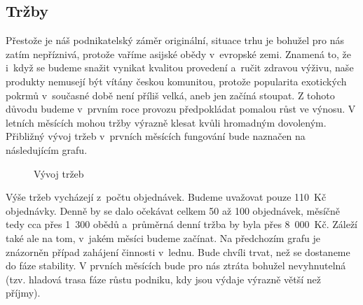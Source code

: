 \subsection{Tržby}
Přestože je náš podnikatelský záměr originální, situace trhu je bohužel pro nás zatím nepříznivá, protože vaříme asijské obědy v~evropské zemi. Znamená to, že i~když se budeme snažit vynikat kvalitou provedení a~ručit zdravou výživu, naše produkty nemusejí být vítány českou komunitou, protože popularita exotických pokrmů v~současné době není příliš velká, aneb jen začíná stoupat. Z tohoto důvodu budeme v~prvním roce provozu předpokládat pomalou růst ve výnosu. V letních měsících mohou tržby výrazně klesat kvůli hromadným dovoleným. Přibližný vývoj tržeb v~prvních měsících fungování bude naznačen na následujícím grafu.

\begin{figure}[htbp]
\pgfplotsset{width=14.8cm,height=6cm,compat=1.9}
\caption{Vývoj tržeb}
\label{vyvoj_trzeb}
\end{figure}

Výše tržeb vycházejí z~počtu objednávek. Budeme uvažovat pouze 110~Kč objednávky. Denně by se dalo očekávat celkem 50 až 100 objednávek, měsíčně tedy cca přes 1~300 obědů a~průměrná denní tržba by byla přes 8~000~Kč. Záleží také ale na tom, v~jakém měsíci budeme začínat. Na předchozím grafu je znázorněn případ zahájení činnosti v~lednu. Bude chvíli trvat, než se dostaneme do fáze stability. V prvních měsících bude pro nás ztráta bohužel nevyhnutelná (tzv. hladová trasa fáze růstu podniku, kdy jsou výdaje výrazně větší než příjmy).

